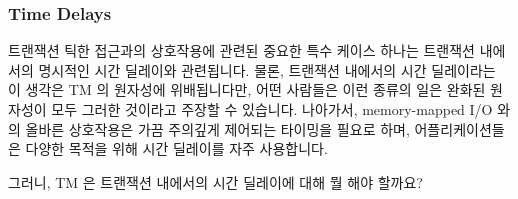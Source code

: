 \subsubsection{Time Delays}
\label{sec:future:Time Delays}

트랜잭션 틱한 접근과의 상호작용에 관련된 중요한 특수 케이스 하나는 트랜잭션
내에서의 명시적인 시간 딜레이와 관련됩니다.
물론, 트랜잭션 내에서의 시간 딜레이라는 이 생각은 TM 의 원자성에 위배됩니다만,
어떤 사람들은 이런 종류의 일은 완화된 원자성이 모두 그러한 것이라고 주장할 수
있습니다.
나아가서, memory-mapped I/O 와의 올바른 상호작용은 가끔 주의깊게 제어되는
타이밍을 필요로 하며, 어플리케이션들은 다양한 목적을 위해 시간 딜레이를 자주
사용합니다.

그러니, TM 은 트랜잭션 내에서의 시간 딜레이에 대해 뭘 해야 할까요?

